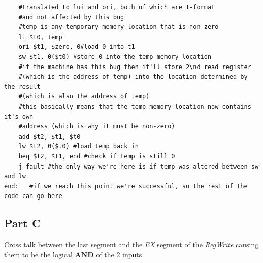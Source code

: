 \documentclass[11pt]{article} %
\newcommand{\strong}[1]{\textbf{#1}}
\newcommand{\nd}{$^{\text{nd}\ }$}
\begin{document}
\begin{verbatim}
    #translated to lui and ori, both of which are I-format 
    #and not affected by this bug
    #temp is any temporary memory location that is non-zero
    li $t0, temp 
    ori $t1, $zero, 0#load 0 into t1
    sw $t1, 0($t0) #store 0 into the temp memory location
    #if the machine has this bug then it'll store 2\nd read register 
    #(which is the address of temp) into the location determined by the result 
    #(which is also the address of temp)
    #this basically means that the temp memory location now contains it's own 
    #address (which is why it must be non-zero)
    add $t2, $t1, $t0 
    lw $t2, 0($t0) #load temp back in
    beq $t2, $t1, end #check if temp is still 0
    j fault #the only way we're here is if temp was altered between sw and lw
end:   #if we reach this point we're successful, so the rest of the code can go here
\end{verbatim}

\subsection{Part C}

Cross talk between the last segment and the \emph{EX} segment of the \emph{RegWrite} causing them to be the logical \strong{AND} of the 2 inputs.
\end{document}
